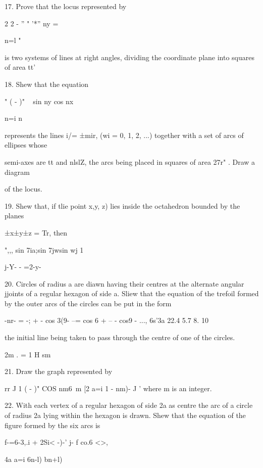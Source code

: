 {

17. Prove that the locus represented by

2 2 - '' " '*'' ny =

n=l "

is two systems of lines at right angles, dividing the coordinate plane
into squares of area tt'\ 

18. Shew that the equation

" ( - )" ~ sin ny cos nx \

n=i n ~

represents the lines i/= ±mir, (wi = 0, 1, 2, ...) together with a set
of arcs of ellipses whose

semi-axes are tt and nlslZ, the arcs being placed in squares of area
27r" . Draw a diagram

of the locus. 

19. Shew that, if tlie point x,y, z) lies inside the octahedron
bounded by the planes

±x±y±z = Tr, then

",,, sin 7ia;sin 7jwsin wj 1

 j-Y- - =2-y-


20. Circles of radius a are diawn having their centres at the
alternate angular jjoints of a regular hexagon of side a. Sliew that
the equation of the trefoil formed by the outer arcs of the circles
can be put in the form

-nr- = -; + - cos 3(9- --= cos 6 + -- - cos9 - ..., 6s'3a 22.4 5.7 8.
10

the initial line being taken to pass through the centre of one of the
circles.


2m . = 1 H sm

%
%

21. Draw the graph represented by

rr J 1 ( - )" COS nm6\ m [2 a=i 1 - nm)- J ' where m is an integer.

22. With each vertex of a regular hexagon of side 2a as centre the arc
of a circle of radius 2a lying within the hexagon is drawn. Shew that
the equation of the figure formed by the six arcs is

f-=6-3,.i + 2Si< -)-' j- f co.6 <>,

4a a=i 6n-l) bn+l)

}

